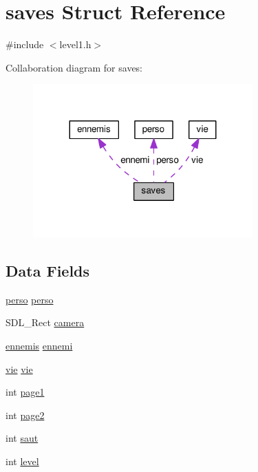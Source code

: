 \hypertarget{structsaves}{}\section{saves Struct Reference}
\label{structsaves}


{\ttfamily \#include $<$level1.\+h$>$}



Collaboration diagram for saves\+:\nopagebreak
\begin{figure}[H]
\begin{center}
\leavevmode
\includegraphics[width=239pt]{structsaves__coll__graph}
\end{center}
\end{figure}
\subsection*{Data Fields}
\begin{DoxyCompactItemize}
\item 
\hyperlink{structperso}{perso} \hyperlink{structsaves_a4ba3cba27704215b96311513ee206401}{perso}
\item 
S\+D\+L\+\_\+\+Rect \hyperlink{structsaves_a4797f7d3b3a1bf30019ec24e4f20b3f1}{camera}
\item 
\hyperlink{structennemis}{ennemis} \hyperlink{structsaves_a94068fb387d61dec9a3f03296d5f2c38}{ennemi}
\item 
\hyperlink{structvie}{vie} \hyperlink{structsaves_ad07a79adf13feb4ffe0f035724ddb04b}{vie}
\item 
int \hyperlink{structsaves_a98a8ba9bd8a8af8f62df3e5f55cbf1a7}{page1}
\item 
int \hyperlink{structsaves_a2d0262e62030f554e86b212e286ce320}{page2}
\item 
int \hyperlink{structsaves_a57efa80fe293ed60438a596d1f42c3b0}{saut}
\item 
int \hyperlink{structsaves_acc2a5ec4f38e63e817228ce80d330cb3}{level}
\end{DoxyCompactItemize}


